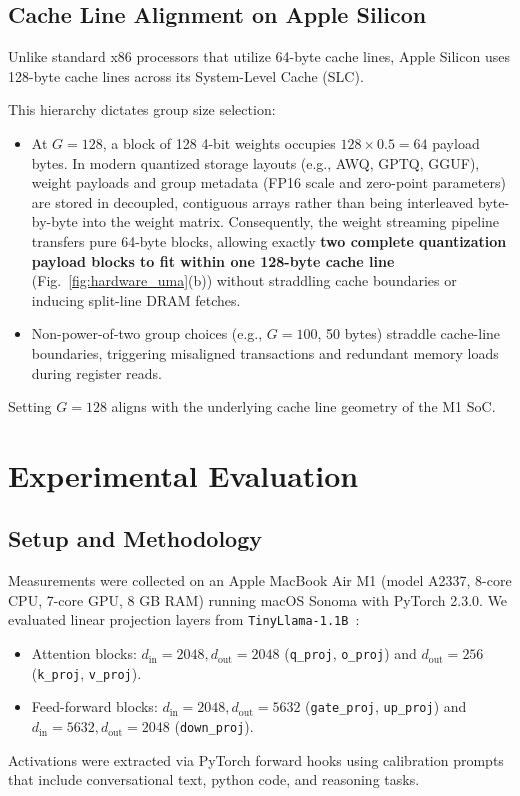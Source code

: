 \documentclass[runningheads,oribibl]{llncs}
\begin{document}
\subsection{Cache Line Alignment on Apple Silicon}
Unlike standard x86 processors that utilize 64-byte cache lines, Apple Silicon uses 128-byte cache lines across its System-Level Cache (SLC).

This hierarchy dictates group size selection:
\begin{itemize}
    \item At $G=128$, a block of 128 4-bit weights occupies $128 \times 0.5 = 64$ payload bytes. In modern quantized storage layouts (e.g., AWQ, GPTQ, GGUF), weight payloads and group metadata (FP16 scale and zero-point parameters) are stored in decoupled, contiguous arrays rather than being interleaved byte-by-byte into the weight matrix. Consequently, the weight streaming pipeline transfers pure 64-byte blocks, allowing exactly \textbf{two complete quantization payload blocks to fit within one 128-byte cache line} (Fig.~\ref{fig:hardware_uma}(b)) without straddling cache boundaries or inducing split-line DRAM fetches.
    \item Non-power-of-two group choices (e.g., $G=100$, 50 bytes) straddle cache-line boundaries, triggering misaligned transactions and redundant memory loads during register reads.
\end{itemize}
Setting $G=128$ aligns with the underlying cache line geometry of the M1 SoC.

\section{Experimental Evaluation}\label{sec:experiments}

\subsection{Setup and Methodology}
Measurements were collected on an Apple MacBook Air M1 (model A2337, 8-core CPU, 7-core GPU, 8 GB RAM) running macOS Sonoma with PyTorch 2.3.0. We evaluated linear projection layers from \texttt{TinyLlama-1.1B}~\cite{zhang2024tinyllama}:
\begin{itemize}
    \item Attention blocks: $d_{\text{in}} = 2048, d_{\text{out}} = 2048$ (\texttt{q\_proj}, \texttt{o\_proj}) and $d_{\text{out}} = 256$ (\texttt{k\_proj}, \texttt{v\_proj}).
    \item Feed-forward blocks: $d_{\text{in}} = 2048, d_{\text{out}} = 5632$ (\texttt{gate\_proj}, \texttt{up\_proj}) and $d_{\text{in}} = 5632, d_{\text{out}} = 2048$ (\texttt{down\_proj}).
\end{itemize}
Activations were extracted via PyTorch forward hooks using calibration prompts that include conversational text, python code, and reasoning tasks.
\end{document}
